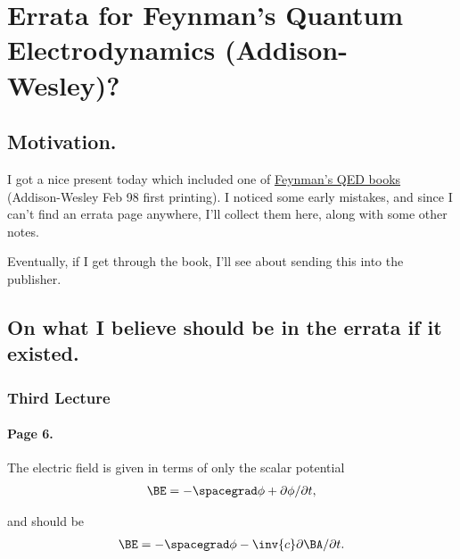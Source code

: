 
%

\chapter{Errata for Feynman's Quantum Electrodynamics (Addison-Wesley)?}
\label{chap:feynmanQEDerrata}
{}
\date{May 28, 2010}

\beginArtWithToc

\section{Motivation.}

I got a nice present today which included one of \href{http://www.amazon.com/Quantum-Electrodynamics-Advanced-Book-Classics/dp/0201360756/ref=sr_1_1?ie=UTF8&s=books&qid=1275092228&sr=8-1}{Feynman's QED books} (Addison-Wesley Feb 98 first printing).  I noticed some early mistakes, and since I can't find an errata page anywhere, I'll collect them here, along with some other notes.

Eventually, if I get through the book, I'll see about sending this into the publisher.

\section{On what I believe should be in the errata if it existed.}
\subsection{Third Lecture}
\subsubsection{Page 6.}

The electric field is given in terms of only the scalar potential
\begin{align*}
\BE = -\spacegrad \phi + \partial \phi/ \partial t,
\end{align*}

and should be
\begin{align*}
\BE = -\spacegrad \phi - \inv{c} \partial \BA/ \partial t.
\end{align*}


